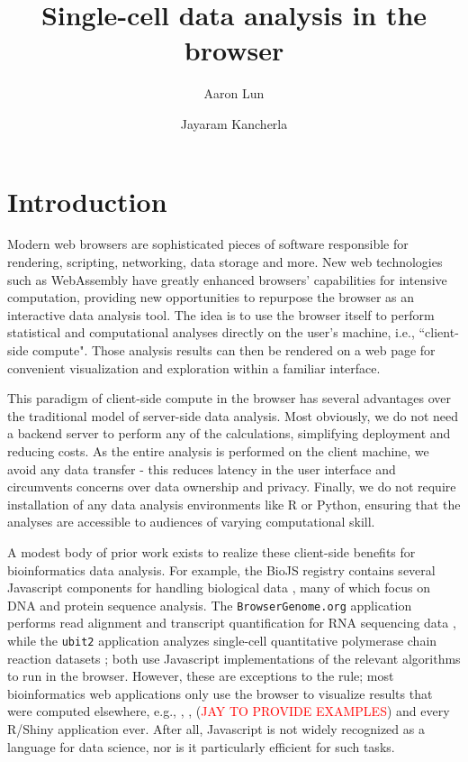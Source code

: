 \documentclass{article}
\title{Single-cell data analysis in the browser}
\author[1]{Aaron Lun}
\affil[1]{Genentech, Inc. South San Francisco, CA}
\author[1]{Jayaram Kancherla}
\begin{document}
\maketitle

\newcommand{\code}[1]{\texttt{#1}}
\newcommand{\jay}[1]{\textcolor{red}{#1}}

\section{Introduction}

Modern web browsers are sophisticated pieces of software responsible for rendering, scripting, networking, data storage and more.
New web technologies such as WebAssembly \cite{haas2017bringing} have greatly enhanced browsers' capabilities for intensive computation,
providing new opportunities to repurpose the browser as an interactive data analysis tool.
The idea is to use the browser itself to perform statistical and computational analyses directly on the user's machine, i.e., ``client-side compute". 
Those analysis results can then be rendered on a web page for convenient visualization and exploration within a familiar interface.

This paradigm of client-side compute in the browser has several advantages over the traditional model of server-side data analysis.
Most obviously, we do not need a backend server to perform any of the calculations, simplifying deployment and reducing costs.
As the entire analysis is performed on the client machine, we avoid any data transfer - this reduces latency in the user interface and circumvents concerns over data ownership and privacy.
Finally, we do not require installation of any data analysis environments like R or Python, ensuring that the analyses are accessible to audiences of varying computational skill.

A modest body of prior work exists to realize these client-side benefits for bioinformatics data analysis.
For example, the BioJS registry contains several Javascript components for handling biological data \cite{gomez2013biojs}, many of which focus on DNA and protein sequence analysis.
The \code{BrowserGenome.org} application performs read alignment and transcript quantification for RNA sequencing data \cite{schmid2015browsergenome},
while the \code{ubit2} application analyzes single-cell quantitative polymerase chain reaction datasets \cite{fan2017ubit2};
both use Javascript implementations of the relevant algorithms to run in the browser.
However, these are exceptions to the rule; most bioinformatics web applications only use the browser to visualize results that were computed elsewhere,
e.g., \cite{megill2021cellxgene}, \cite{chelaru2014epiviz}, (\jay{JAY TO PROVIDE EXAMPLES}) and every R/Shiny application ever.
After all, Javascript is not widely recognized as a language for data science, nor is it particularly efficient for such tasks.
\end{document}
